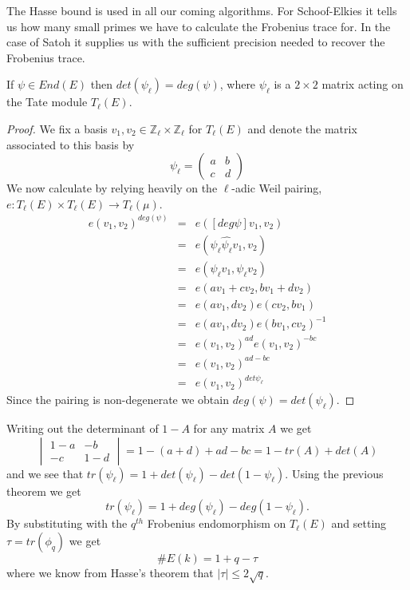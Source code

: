 The Hasse bound is used in all our coming algorithms. For Schoof-Elkies it tells us how many
small primes we have to calculate the Frobenius trace for. In the case of Satoh it supplies us
with the sufficient precision needed to recover the Frobenius trace.

\begin{prop} 
 If $\psi \in End(E)$ then $det(\psi_\ell) = deg(\psi)$, where $\psi_\ell$ is a $2\times2$ matrix acting
on the Tate module $T_\ell(E)$.
\label{detdeg}
\end{prop}
\begin{proof}
 We fix a basis $v_1,v_2 \in \mathbb{Z}_\ell \times \mathbb{Z}_\ell$ for $T_\ell(E)$ and denote the matrix
associated to this basis by
$$ \psi_\ell = \begin{pmatrix} a & b \\ c & d \end{pmatrix} $$
We now calculate by relying heavily on the $\ell$-adic Weil pairing,
$e: T_\ell(E) \times T_\ell(E) \rightarrow T_\ell(\mu)$.
\begin{eqnarray}
 e(v_1, v_2)^{deg(\psi)} &=& e([deg \psi]v_1, v_2) \nonumber \\
			 &=& e(\psi_\ell \widehat{\psi_\ell} v_1, v_2) \nonumber \\
			 &=& e(\psi_\ell v_1, \psi_\ell v_2) \nonumber \\
			 &=& e(a v_1 + c v_2, b v_1 + d v_2) \nonumber \\
			 &=& e(a v_1, d v_2) e(c v_2, b v_1) \nonumber \\
			 &=& e(a v_1, d v_2) e(b v_1, c v_2)^{-1} \nonumber \\
			 &=& e(v_1, v_2)^{ad} e(v_1, v_2)^{-bc} \nonumber \\
			 &=& e(v_1, v_2)^{ad - bc} \nonumber \\
			 &=& e(v_1, v_2)^{det \psi_\ell} \nonumber
\end{eqnarray}
Since the pairing is non-degenerate we obtain $deg(\psi) = det(\psi_\ell)$.
\end{proof}

Writing out the determinant of $1-A$ for any matrix $A$ we get
$$ \begin{vmatrix} 1-a & -b \\ -c & 1-d \end{vmatrix} = 1-(a+d)+ad-bc = 1-tr(A)+det(A) $$
and we see that $tr(\psi_\ell) = 1 + det(\psi_\ell) - det(1-\psi_\ell)$. Using the previous theorem we
get $$tr(\psi_\ell) = 1 + deg(\psi_\ell) - deg(1-\psi_\ell).$$ By substituting with the $q^{th}$ 
Frobenius endomorphism on $T_\ell(E)$ and setting $\tau = tr(\phi_q)$ we get
$$\#E(k) = 1 + q - \tau$$
where we know from Hasse's theorem that $\lvert \tau \rvert \leq 2\sqrt{q}$.

